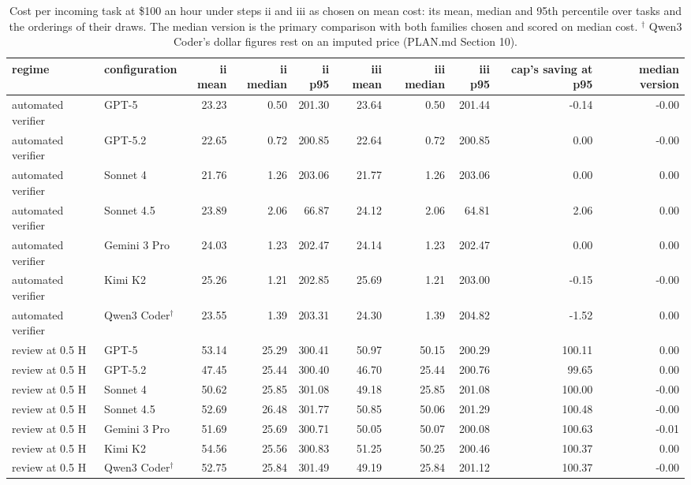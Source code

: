 \begin{table}[t]
\centering
\small
\caption{Cost per incoming task at \$100 an hour under steps ii and iii as chosen on mean cost: its mean, median and 95th percentile over tasks and the orderings of their draws. The median version is the primary comparison with both families chosen and scored on median cost. $^\dagger$ Qwen3 Coder's dollar figures rest on an imputed price (PLAN.md Section 10).}
\label{tab:tableA7_distribution}
\begin{tabular}{llrrrrrrrr}
\toprule
regime & configuration & ii mean & ii median & ii p95 & iii mean & iii median & iii p95 & cap's saving at p95 & median version \\
\midrule
automated verifier & GPT-5 & 23.23 & 0.50 & 201.30 & 23.64 & 0.50 & 201.44 & -0.14 & -0.00 \\
automated verifier & GPT-5.2 & 22.65 & 0.72 & 200.85 & 22.64 & 0.72 & 200.85 & 0.00 & -0.00 \\
automated verifier & Sonnet 4 & 21.76 & 1.26 & 203.06 & 21.77 & 1.26 & 203.06 & 0.00 & 0.00 \\
automated verifier & Sonnet 4.5 & 23.89 & 2.06 & 66.87 & 24.12 & 2.06 & 64.81 & 2.06 & 0.00 \\
automated verifier & Gemini 3 Pro & 24.03 & 1.23 & 202.47 & 24.14 & 1.23 & 202.47 & 0.00 & 0.00 \\
automated verifier & Kimi K2 & 25.26 & 1.21 & 202.85 & 25.69 & 1.21 & 203.00 & -0.15 & -0.00 \\
automated verifier & Qwen3 Coder$^\dagger$ & 23.55 & 1.39 & 203.31 & 24.30 & 1.39 & 204.82 & -1.52 & 0.00 \\
\midrule
review at 0.5 H & GPT-5 & 53.14 & 25.29 & 300.41 & 50.97 & 50.15 & 200.29 & 100.11 & 0.00 \\
review at 0.5 H & GPT-5.2 & 47.45 & 25.44 & 300.40 & 46.70 & 25.44 & 200.76 & 99.65 & 0.00 \\
review at 0.5 H & Sonnet 4 & 50.62 & 25.85 & 301.08 & 49.18 & 25.85 & 201.08 & 100.00 & -0.00 \\
review at 0.5 H & Sonnet 4.5 & 52.69 & 26.48 & 301.77 & 50.85 & 50.06 & 201.29 & 100.48 & -0.00 \\
review at 0.5 H & Gemini 3 Pro & 51.69 & 25.69 & 300.71 & 50.05 & 50.07 & 200.08 & 100.63 & -0.01 \\
review at 0.5 H & Kimi K2 & 54.56 & 25.56 & 300.83 & 51.25 & 50.25 & 200.46 & 100.37 & 0.00 \\
review at 0.5 H & Qwen3 Coder$^\dagger$ & 52.75 & 25.84 & 301.49 & 49.19 & 25.84 & 201.12 & 100.37 & -0.00 \\
\bottomrule
\end{tabular}
\end{table}
